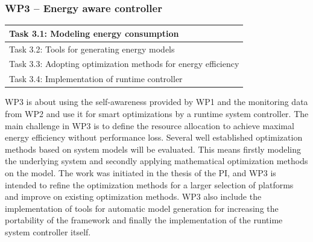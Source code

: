 \documentclass{article}
\begin{document}
\subsubsection{WP3 -- Energy aware controller}
\begin{table}
\vspace{-0.5cm}
\small
\begin{tabular}{ | l |}
\hline
Task 3.1: Modeling energy consumption\\ \hline
Task 3.2: Tools for generating energy models \\ \hline
Task 3.3: Adopting optimization methods for energy efficiency \\ \hline
Task 3.4: Implementation of runtime controller \\ \hline
\end{tabular}
\vspace{-0.3cm}
\end{table}
WP3 is about using the self-awareness provided by WP1 and the monitoring data from WP2 and use it for smart optimizations by a runtime system controller.
The main challenge in WP3 is to define the resource allocation to achieve maximal energy efficiency without performance loss.
Several well established optimization methods based on system models will be evaluated.
This means firstly modeling the underlying system and secondly applying mathematical optimization methods on the model.
The work was initiated in the thesis of the PI, and WP3 is intended to refine the optimization methods for a larger selection of platforms and improve on existing optimization methods.
WP3 also include the implementation of tools for automatic model generation for increasing the portability of the framework and finally the implementation of the runtime system controller itself.
\end{document}
